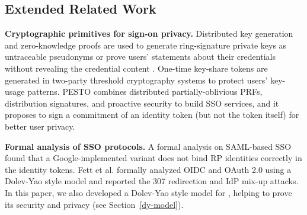 \subsection{Extended Related Work}
\noindent\textbf{Cryptographic primitives for sign-on privacy.}
Distributed key generation and zero-knowledge proofs are used to generate ring-signature private keys as untraceable pseudonyms \cite{crypto-book} or prove users' statements about their credentials without revealing the credential content \cite{zklaim}.
One-time key-share tokens \cite{tandem} are generated in two-party threshold cryptography systems to protect users' key-usage patterns.
\newc
PESTO \cite{pesto} combines distributed partially-oblivious PRFs, distribution signatures,
    and proactive security to build SSO services,
    and it proposes to sign a commitment of an identity token (but not the token itself) for better user privacy.



 \oldc\noindent\textbf{Formal analysis of SSO protocols.}
A formal analysis on SAML-based SSO \cite{ArmandoCCCT08} found that a Google-implemented variant does not bind RP identities correctly in the identity tokens.
Fett et al. \cite{FettKS16, FettKS17} formally analyzed OIDC and OAuth 2.0 using a Dolev-Yao style model \cite{FettKS14} and reported the 307 redirection and IdP mix-up attacks.
In this paper, we also developed a Dolev-Yao style model for \usso, helping to prove its security and privacy (see Section~\ref{dy-model}).



